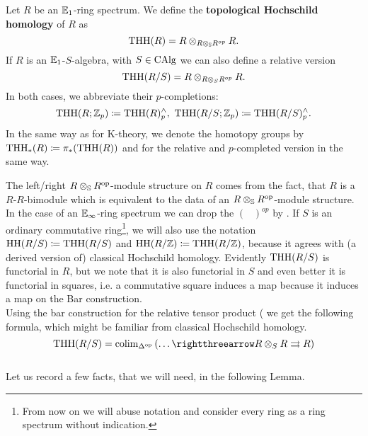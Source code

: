 \begin{defn}
    Let $R$ be an $\mathbb{E}_1$-ring spectrum.
    We define the \textbf{topological Hochschild homology} of $R$ as 
    \begin{equation*}
        \operatorname{THH}(R)=R\otimes_{R\otimes_{\mathbb{S}} R^{op}}R.
    \end{equation*}
    If $R$ is an $\mathbb{E}_1$-$S$-algebra, with $S\in\operatorname{CAlg}$ we can also define a relative version
    \begin{equation*}
        \operatorname{THH}(R/S)=R\otimes_{R\otimes_S R^{op}}R.
    \end{equation*}
    In both cases, we abbreviate their $p$-completions:
    \begin{equation*}
        \THH(R;\Z_p)\coloneqq\THH(R)^{\wedge}_p,\ \THH(R/S;\Z_p)\coloneqq\THH(R/S)^{\wedge}_p.
    \end{equation*}
    In the same way as for K-theory, we denote the homotopy groups by $\operatorname{THH}_*(R)\coloneqq \pi_*(\operatorname{THH}(R))$ and for the relative and $p$-completed version in the same way.
\end{defn}
The left/right $R\otimes_{\mathbb{S}} R^{\operatorname{op}}$-module structure on $R$ comes from the fact, that $R$ is a $R$-$R$-bimodule which is equivalent to the data of an $R\otimes_{\mathbb{S}} R^{\operatorname{op}}$-module structure. 
In the case of an $\mathbb{E}_\infty$-ring spectrum we can drop the $(\phantom{R})^{op}$ by \cite[Section~4.6.3]{lurie2017higher}. 
If $S$ is an ordinary commutative ring\footnote{From now on we will abuse notation and consider every ring as a ring spectrum without indication.}, we will also use the notation $\operatorname{HH}(R/S)\coloneqq \operatorname{THH}(R/S)$ and $\operatorname{HH}(R/\mathbb{Z})\coloneqq \operatorname{THH}(R/\mathbb{Z})$, because it agrees with (a derived version of) classical Hochschild homology.
Evidently $\operatorname{THH}(R/S)$ is functorial in $R$, but we note that it is also functorial in $S$ and even better it is functorial in squares, i.e. a commutative square induces a map because it induces a map on the Bar construction.\\ 
Using the bar construction for the relative tensor product (\cite[Section~4.4.2]{lurie2017higher} we get the following formula, which might be familiar from classical Hochschild homology.
\begin{equation*}
    \THH(R/S)=\colim_{\Delta^{\op}}\left(\dots \rightthreearrow R\otimes_S R\rightrightarrows R\right)
\end{equation*}
\\
Let us record a few facts, that we will need, in the following Lemma.
